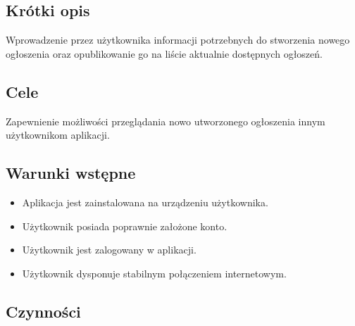 \documentclass[licencjacka]{pracamgr}
\begin{document}
    \subsection{Krótki opis}
    Wprowadzenie przez użytkownika informacji potrzebnych do stworzenia nowego ogłoszenia oraz opublikowanie go na liście aktualnie dostępnych
    ogłoszeń.
    \subsection{Cele}
    Zapewnienie możliwości przeglądania nowo utworzonego ogłoszenia innym użytkownikom aplikacji.
    \subsection{Warunki wstępne}
    \begin{itemize}
        \item Aplikacja jest zainstalowana na urządzeniu użytkownika.
        \item Użytkownik posiada poprawnie założone konto.
        \item Użytkownik jest zalogowany w aplikacji.
        \item Użytkownik dysponuje stabilnym połączeniem internetowym.
    \end{itemize}
    \subsection{Czynności}\label{r:czynnosci-link2}
\end{document}
